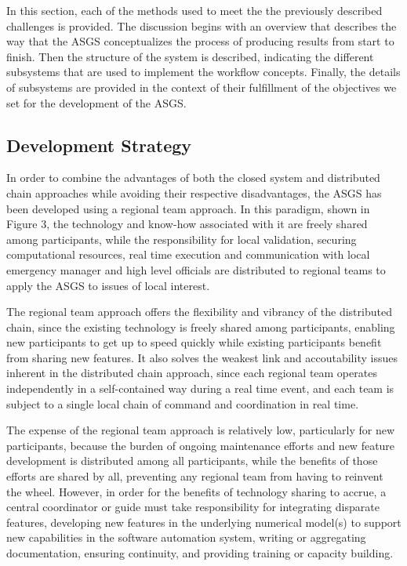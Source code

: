 \documentclass[12pt]{article}
\begin{document}
In this section, each of the methods used to meet the the previously 
described challenges is provided. The discussion begins with an 
overview that describes the way that the ASGS conceptualizes the 
process of producing results from start to finish. Then the 
structure of the system is described, indicating the different 
subsystems that are used to implement the workflow concepts. 
Finally, the details of subsystems are provided in the context of 
their fulfillment of the objectives we set for the development of 
the ASGS.  

\subsection{Development Strategy}

In order to combine the advantages of both the closed system and 
distributed chain approaches while avoiding their respective 
disadvantages, the ASGS has been developed using a regional team 
approach. In this paradigm, shown in Figure 3, the technology and 
know-how associated with it are freely shared among participants, 
while the responsibility for local validation, securing computational 
resources, real time execution and communication with local emergency
manager and high level officials are distributed to regional teams 
to apply the ASGS to issues of local interest. 

The regional team approach offers the flexibility and vibrancy of 
the distributed chain, since the existing technology is freely 
shared among participants, enabling new participants to get up to 
speed quickly while existing participants benefit from sharing  new 
features. It also solves the weakest link and accoutability issues 
inherent in the distributed chain approach, since each regional team 
operates independently in a self-contained way during a real time 
event, and each team is subject to a single local chain of command and 
coordination in real time.

The expense of the regional team approach is relatively low, 
particularly for new participants, because the burden of ongoing 
maintenance efforts and new feature development is distributed among 
all participants, while the benefits of those efforts are shared by 
all, preventing any regional team from having to reinvent the wheel. 
However, in order for the benefits of technology sharing to accrue, 
a central coordinator or guide must take responsibility for 
integrating disparate features, developing new features in the 
underlying numerical model(s) to support new capabilities in the 
software automation system, writing or aggregating documentation, 
ensuring continuity, and providing training or capacity building. 
\end{document}
